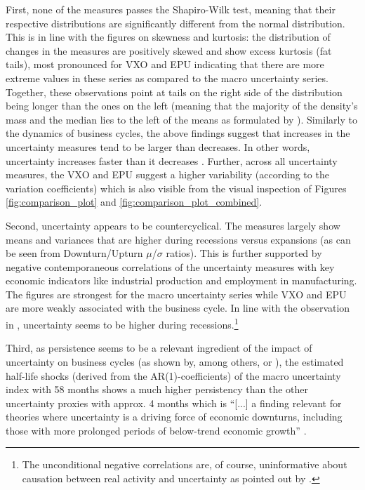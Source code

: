 \documentclass[a4paper,11pt,listof=nochaptergap,oneside,pointednumbers,bibtotoc,bigheadings,liststotoc,hidelinks]{scrbook}
\theoremstyle{mysatz}
\theoremstyle{mydefinition}
\theoremstyle{mytheorem}
\theoremstyle{mybemerkung}
\begin{document}
First, none of the measures passes the Shapiro-Wilk test, meaning that their respective distributions are significantly different from the normal distribution. This is in line with the figures on skewness and kurtosis: the distribution of changes in the measures are positively skewed and show excess kurtosis (fat tails), most pronounced for VXO and EPU indicating that there are more extreme values in these series as compared to the macro uncertainty series. Together, these observations point at tails on the right side of the distribution being longer than the ones on the left (meaning that the majority of the density's mass and the median lies to the left of the means as formulated by \citealp{bontempietal:16}). Similarly to the dynamics of business cycles, the above findings suggest that increases in the uncertainty measures tend to be larger than decreases. In other words, uncertainty increases faster than it decreases \citep{moore:17}. Further, across all uncertainty measures, the VXO and EPU suggest a higher variability (according to the variation coefficients) which is also visible from the visual inspection of Figures \ref{fig:comparison_plot} and \ref{fig:comparison_plot_combined}.

Second, uncertainty appears to be countercyclical. The measures largely show means and variances that are higher during recessions versus expansions (as can be seen from Downturn/Upturn $\mu$/$\sigma$ ratios). This is further supported by negative contemporaneous correlations of the uncertainty measures with key economic indicators like industrial production \citep{juradoetal:15} and employment in manufacturing. The figures are strongest for the macro uncertainty series while VXO and EPU are more weakly associated with the business cycle. In line with the observation in \citet{bloom:14}, uncertainty seems to be higher during recessions.\footnote{The unconditional negative correlations are, of course, uninformative about causation between real activity and uncertainty as pointed out by \citet{juradoetal:15}.}


Third, as persistence seems to be a relevant ingredient of the impact of uncertainty on business cycles (as shown by, among others, \citet{schaal:17} or \citet{juradoetal:15}), the estimated half-life shocks (derived from the AR(1)-coefficients) of the macro uncertainty index with 58 months shows a much higher persistency than the other uncertainty proxies with approx. 4 months which is ``[...] a finding relevant for theories where uncertainty is a driving force of economic downturns, including those with more prolonged periods of below-trend economic growth'' \citep[p. 1193]{juradoetal:15}. 
\end{document}
